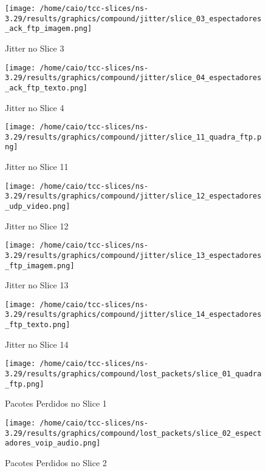 \documentclass[11pt,twoside]{article}
\begin{document}
	\begin{figure}[H]
		\centering
		\texttt{[image: /home/caio/tcc-slices/ns-3.29/results/graphics/compound/jitter/slice\_03\_espectadores\_ack\_ftp\_imagem.png]}
		\caption{Jitter no Slice 3}
		\label{jitter3}
	\end{figure}
	
	\begin{figure}[H]
		\centering
		\texttt{[image: /home/caio/tcc-slices/ns-3.29/results/graphics/compound/jitter/slice\_04\_espectadores\_ack\_ftp\_texto.png]}
		\caption{Jitter no Slice 4}
		\label{jitter4}
	\end{figure}
	
	\begin{figure}[H]
		\centering
		\texttt{[image: /home/caio/tcc-slices/ns-3.29/results/graphics/compound/jitter/slice\_11\_quadra\_ftp.png]}
		\caption{Jitter no Slice 11}
		\label{jitter11}
	\end{figure}
	
	\begin{figure}[H]
		\centering
		\texttt{[image: /home/caio/tcc-slices/ns-3.29/results/graphics/compound/jitter/slice\_12\_espectadores\_udp\_video.png]}
		\caption{Jitter no Slice 12}
		\label{jitter12}
	\end{figure}
	
	\begin{figure}[H]
		\centering
		\texttt{[image: /home/caio/tcc-slices/ns-3.29/results/graphics/compound/jitter/slice\_13\_espectadores\_ftp\_imagem.png]}
		\caption{Jitter no Slice 13}
		\label{jitter13}
	\end{figure}
	
	\begin{figure}[H]
		\centering
		\texttt{[image: /home/caio/tcc-slices/ns-3.29/results/graphics/compound/jitter/slice\_14\_espectadores\_ftp\_texto.png]}
		\caption{Jitter no Slice 14}
		\label{jitter14}
	\end{figure}
	
	\begin{figure}[H]
		\centering
		\texttt{[image: /home/caio/tcc-slices/ns-3.29/results/graphics/compound/lost\_packets/slice\_01\_quadra\_ftp.png]}
		\caption{Pacotes Perdidos no Slice 1}
		\label{lost_packets1}
	\end{figure}
	
	\begin{figure}[H]
		\centering
		\texttt{[image: /home/caio/tcc-slices/ns-3.29/results/graphics/compound/lost\_packets/slice\_02\_espectadores\_voip\_audio.png]}
		\caption{Pacotes Perdidos no Slice 2}
		\label{lost_packets2}
	\end{figure}
	
\end{document}
